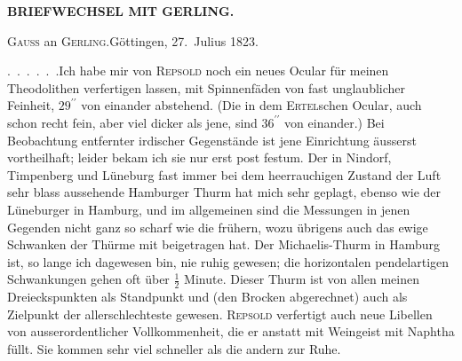 \par\clearpage
\noindent{}\hfill{\small\textbf{BRIEFWECHSEL MIT GERLING.}}\hfill\null\par\medskip
\begin{center}
\textsc{Gauss} an \textsc{Gerling}.\quad Göttingen, 27.~Julius 1823.
\end{center}

\par\noindent\hspace*{\parindent}\mbox{.\ .\ .\ .\ .\ .}\quad Ich habe mir von \textsc{Repsold} noch ein neues Ocular für meinen Theodolithen verfertigen lassen, mit Spinnenfäden von fast unglaublicher Feinheit, \(29^{\prime\prime}\) von einander abstehend.
(Die in dem \textsc{Ertel}schen Ocular, auch schon recht fein, aber viel dicker als jene, sind \(36^{\prime\prime}\) von einander.)
Bei Beobachtung entfernter  irdischer Gegenstände ist jene Einrichtung äusserst vortheilhaft; leider bekam ich sie nur erst post festum.
Der in Nindorf, Timpenberg und Lüneburg fast immer bei dem heerrauchigen Zustand der Luft sehr blass aussehende Hamburger Thurm hat mich sehr geplagt, ebenso wie der Lüneburger in Hamburg, und im allgemeinen sind die Messungen in jenen Gegenden nicht ganz so scharf wie die frühern, wozu übrigens auch das ewige Schwanken der Thürme mit beigetragen hat.
Der Michaelis-Thurm in Hamburg ist, so lange ich dagewesen bin, nie ruhig gewesen; die horizontalen pendelartigen Schwankungen gehen oft über \(\frac{1}{2}\) Minute.
Dieser Thurm ist von allen meinen Dreieckspunkten als Standpunkt und (den Brocken abgerechnet) auch als Zielpunkt der allerschlechteste gewesen.
\textsc{Repsold} verfertigt auch neue Libellen von ausserordentlicher Vollkommenheit, die er anstatt mit Weingeist mit Naphtha füllt.
Sie kommen sehr viel schneller als die andern zur Ruhe.

